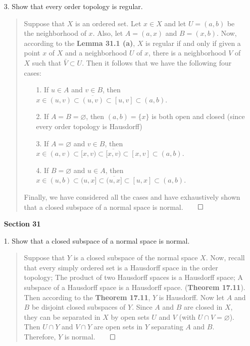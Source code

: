 \documentclass[12pt, a4paper]{article}
\renewcommand{\emptyset}{\varnothing}  %
\begin{document}
\begin{itemize}
\newpage

\item[3.]
Show that every order topology is regular.
\begin{quote}
Suppose that $X$ is an ordered set. Let $x \in X$ and let $U = (a, b)$
be the neighborhood of $x$. Also, let $A = (a, x)$ and $B = (x, b)$.
Now, according to the \textbf{Lemma 31.1 (a)}, $X$ is regular if and only if given a point $x$ of $X$ and a neighborhood
$U$ of $x$, there is a neighborhood $V$ of $X$ such that $\bar{V} \subset U$.
Then it follows that we have the following four cases:
\begin{itemize}
\item[1.]
If $u \in A$ and $v \in B$, then $x \in (u, v) \subset \overline{(u, v)} \subset [u, v] \subset (a, b)$.
\item[2.]
If $A = B = \emptyset$, then $(a, b) = \{x\}$ is both open and closed (since every order topology is Hausdorff)
\item[3.]
If $A = \emptyset$ and $v \in B$, then $x \in (a, v) \subset [x, v) \subset \overline{[x, v)} \subset [x, v] \subset (a, b)$.
\item[4.]
If $B = \emptyset$ and $u \in A$, then $x \in (u, b) \subset (u, x] \subset \overline{(u, x]} \subset [u, x] \subset (a, b)$.
\end{itemize}
Finally, we have considered all the cases and have exhaustively shown that a closed subspace of a normal space is normal.$\qed$
\end{quote}


\item[]
\item[]
\item[]
{\large \textbf{Section 31}}
\vspace{0.3cm}

\item[1.]
Show that a closed subspace of a normal space is normal.
\begin{quote}
Suppose that $Y$ is a closed subspace of the normal space $X$.
Now, recall that every simply ordered set is a Hausdorff space in the
order topology; The product of two Hausdorff spaces is a Hausdorff space;
A subspace of a Hausdorff space is a Hausdorff space. (\textbf{Theorem 17.11}).
Then according to the \textbf{Theorem 17.11}, $Y$ is Hausdorff.
Now let $A$ and $B$ be disjoint closed subspaces of $Y$. Since $A$ and $B$ are
closed in $X$, they can be separated in $X$ by open sets $U$ and $V$ (with $U \cap V = \emptyset$).
Then $U \cap Y$ and $V \cap Y$ are open sets in $Y$ separating $A$ and $B$.
Therefore, $Y$ is normal.$\qed$
\end{quote}

\end{itemize}
\end{document}
